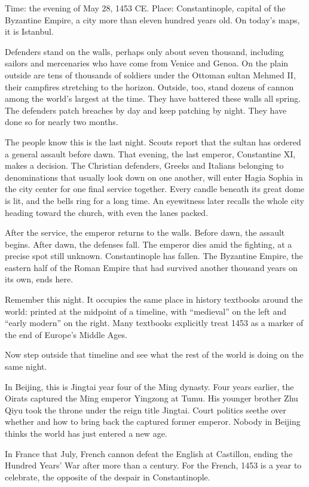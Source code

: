 Time: the evening of May 28, 1453 CE. Place: Constantinople, capital of the Byzantine Empire, a city more than eleven hundred years old. On today's maps, it is Istanbul.

Defenders stand on the walls, perhaps only about seven thousand, including sailors and mercenaries who have come from Venice and Genoa. On the plain outside are tens of thousands of soldiers under the Ottoman sultan Mehmed II, their campfires stretching to the horizon. Outside, too, stand dozens of cannon among the world's largest at the time. They have battered these walls all spring. The defenders patch breaches by day and keep patching by night. They have done so for nearly two months.

The people know this is the last night. Scouts report that the sultan has ordered a general assault before dawn. That evening, the last emperor, Constantine XI, makes a decision. The Christian defenders, Greeks and Italians belonging to denominations that usually look down on one another, will enter Hagia Sophia in the city center for one final service together. Every candle beneath its great dome is lit, and the bells ring for a long time. An eyewitness later recalls the whole city heading toward the church, with even the lanes packed.

After the service, the emperor returns to the walls. Before dawn, the assault begins. After dawn, the defenses fall. The emperor dies amid the fighting, at a precise spot still unknown. Constantinople has fallen. The Byzantine Empire, the eastern half of the Roman Empire that had survived another thousand years on its own, ends here.

Remember this night. It occupies the same place in history textbooks around the world: printed at the midpoint of a timeline, with ``medieval'' on the left and ``early modern'' on the right. Many textbooks explicitly treat 1453 as a marker of the end of Europe's Middle Ages.

Now step outside that timeline and see what the rest of the world is doing on the same night.

In Beijing, this is Jingtai year four of the Ming dynasty. Four years earlier, the Oirats captured the Ming emperor Yingzong at Tumu. His younger brother Zhu Qiyu took the throne under the reign title Jingtai. Court politics seethe over whether and how to bring back the captured former emperor. Nobody in Beijing thinks the world has just entered a new age.

In France that July, French cannon defeat the English at Castillon, ending the Hundred Years' War after more than a century. For the French, 1453 is a year to celebrate, the opposite of the despair in Constantinople.

